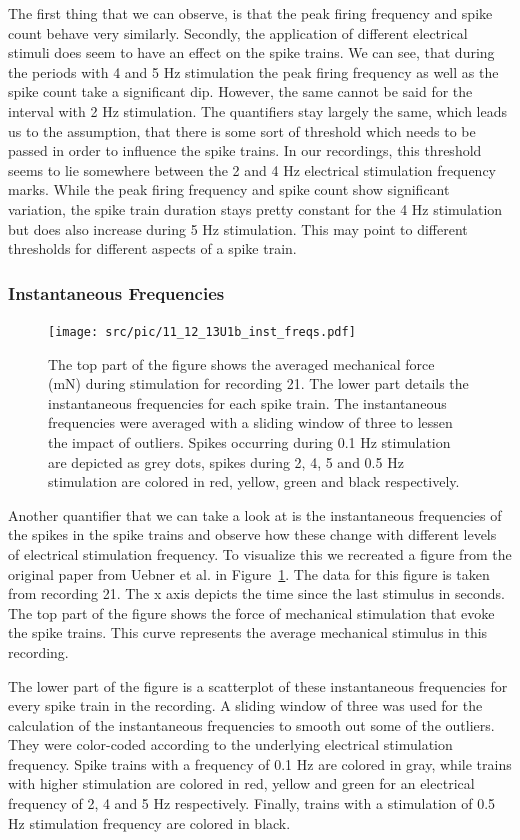 The first thing that we can observe, is that the peak firing frequency and spike count behave very similarly. Secondly, the application of different electrical stimuli does seem to have an effect on the spike trains. We can see, that during the periods with 4 and 5 Hz stimulation the peak firing frequency as well as the spike count take a significant dip. However, the same cannot be said for the interval with 2 Hz stimulation. The quantifiers stay largely the same, which leads us to the assumption, that there is some sort of threshold which needs to be passed in order to influence the spike trains. In our recordings, this threshold seems to lie somewhere between the 2 and 4 Hz electrical stimulation frequency marks.
While the peak firing frequency and spike count show significant variation, the spike train duration stays pretty constant for the 4 Hz stimulation but does also increase during 5 Hz stimulation. This may point to different thresholds for different aspects of a spike train.

\subsubsection{Instantaneous Frequencies}
\begin{figure}
	\texttt{[image: src/pic/11\_12\_13U1b\_inst\_freqs.pdf]}
	\caption{The top part of the figure shows the averaged mechanical force (mN) during stimulation for recording 21. The lower part details the instantaneous frequencies for each spike train. The instantaneous frequencies were averaged with a sliding window of three to lessen the impact of outliers. Spikes occurring during 0.1 Hz stimulation are depicted as grey dots, spikes during 2, 4, 5 and 0.5 Hz stimulation are colored in red, yellow, green and black respectively.}
	\label{fig:inst_freqs}
\end{figure}
Another quantifier that we can take a look at is the instantaneous frequencies of the spikes in the spike trains and observe how these change with different levels of electrical stimulation frequency. To visualize this we recreated a figure from the original paper from Uebner et al. in Figure~\ref{fig:inst_freqs}. The data for this figure is taken from recording 21. The x axis depicts the time since the last stimulus in seconds. The top part of the figure shows the force of mechanical stimulation that evoke the spike trains. This curve represents the average mechanical stimulus in this recording. 

The lower part of the figure is a scatterplot of these instantaneous frequencies for every spike train in the recording. A sliding window of three was used for the calculation of the instantaneous frequencies to smooth out some of the outliers. They were color-coded according to the underlying electrical stimulation frequency. Spike trains with a frequency of 0.1 Hz are colored in gray, while trains with higher stimulation are colored in red, yellow and green for an electrical frequency of 2, 4 and 5 Hz respectively. Finally, trains with a stimulation of 0.5 Hz stimulation frequency are colored in black. 

